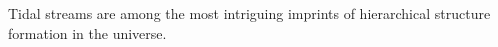 Tidal streams are among the most intriguing imprints of hierarchical structure formation in the universe.
